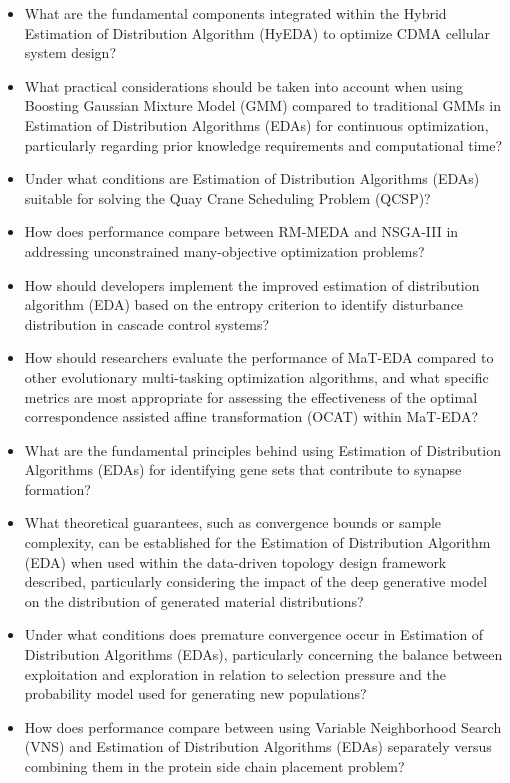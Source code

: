 \begin{itemize}[noitemsep]
    \item What are the fundamental components integrated within the Hybrid Estimation of Distribution Algorithm (HyEDA) to optimize CDMA cellular system design?
    \item What practical considerations should be taken into account when using Boosting Gaussian Mixture Model (GMM) compared to traditional GMMs in Estimation of Distribution Algorithms (EDAs) for continuous optimization, particularly regarding prior knowledge requirements and computational time?
    \item Under what conditions are Estimation of Distribution Algorithms (EDAs) suitable for solving the Quay Crane Scheduling Problem (QCSP)?
    \item How does performance compare between RM-MEDA and NSGA-III in addressing unconstrained many-objective optimization problems?
    \item How should developers implement the improved estimation of distribution algorithm (EDA) based on the entropy criterion to identify disturbance distribution in cascade control systems?
    \item How should researchers evaluate the performance of MaT-EDA compared to other evolutionary multi-tasking optimization algorithms, and what specific metrics are most appropriate for assessing the effectiveness of the optimal correspondence assisted affine transformation (OCAT) within MaT-EDA?
    \item What are the fundamental principles behind using Estimation of Distribution Algorithms (EDAs) for identifying gene sets that contribute to synapse formation?
    \item What theoretical guarantees, such as convergence bounds or sample complexity, can be established for the Estimation of Distribution Algorithm (EDA) when used within the data-driven topology design framework described, particularly considering the impact of the deep generative model on the distribution of generated material distributions?
    \item Under what conditions does premature convergence occur in Estimation of Distribution Algorithms (EDAs), particularly concerning the balance between exploitation and exploration in relation to selection pressure and the probability model used for generating new populations?
    \item How does performance compare between using Variable Neighborhood Search (VNS) and Estimation of Distribution Algorithms (EDAs) separately versus combining them in the protein side chain placement problem?

\end{itemize}
